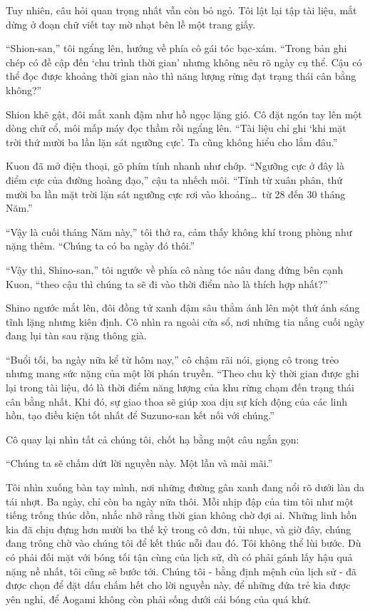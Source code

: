 \documentclass[../main.tex]{subfiles}
\begin{document}
Tuy nhiên, câu hỏi quan trọng nhất vẫn còn bỏ ngỏ. Tôi lật lại tập tài liệu, mắt dừng ở đoạn chữ viết tay mờ nhạt bên lề một trang giấy.

``Shion-san,'' tôi ngẩng lên, hướng về phía cô gái tóc bạc-xám. ``Trong bản ghi chép có đề cập đến `chu trình thời gian' nhưng không nêu rõ ngày cụ thể. Cậu có thể đọc được khoảng thời gian nào thì năng lượng rừng đạt trạng thái cân bằng không?''

Shion khẽ gật, đôi mắt xanh đậm như hồ ngọc lặng gió. Cô đặt ngón tay lên một dòng chữ cổ, môi mấp máy đọc thầm rồi ngẩng lên. ``Tài liệu chỉ ghi `khi mặt trời thứ mười ba lần lặn sát ngưỡng cực'. Ta cũng không hiểu cho lắm đâu.''

Kuon đã mở điện thoại, gõ phím tính nhanh như chớp. ``Ngưỡng cực ở đây là điểm cực của đường hoàng đạo,'' cậu ta nhếch môi. ``Tính từ xuân phân, thứ mười ba lần mặt trời lặn sát ngưỡng cực rơi vào khoảng\dots\ từ 28 đến 30 tháng Năm.''

``Vậy là cuối tháng Năm này,'' tôi thở ra, cảm thấy không khí trong phòng như nặng thêm. ``Chúng ta có ba ngày đó thôi.''

``Vậy thì, Shino-san,'' tôi ngước về phía cô nàng tóc nâu đang đứng bên cạnh Kuon, ``theo cậu thì chúng ta sẽ đi vào thời điểm nào là thích hợp nhất?''

Shino ngước mắt lên, đôi đồng tử xanh đậm sâu thẳm ánh lên một thứ ánh sáng tĩnh lặng nhưng kiên định. Cô nhìn ra ngoài cửa sổ, nơi những tia nắng cuối ngày đang lụi tàn sau rặng thông già.

``Buổi tối, ba ngày nữa kể từ hôm nay,'' cô chậm rãi nói, giọng cô trong trẻo nhưng mang sức nặng của một lời phán truyền. ``Theo chu kỳ thời gian được ghi lại trong tài liệu, đó là thời điểm năng lượng của khu rừng chạm đến trạng thái cân bằng nhất. Khi đó, sự giao thoa sẽ giúp xoa dịu sự kích động của các linh hồn, tạo điều kiện tốt nhất để Suzuno-san kết nối với chúng.''

Cô quay lại nhìn tất cả chúng tôi, chốt hạ bằng một câu ngắn gọn:

``Chúng ta sẽ chấm dứt lời nguyền này. Một lần và mãi mãi.''

Tôi nhìn xuống bàn tay mình, nơi những đường gân xanh đang nổi rõ dưới làn da tái nhợt. Ba ngày, chỉ còn ba ngày nữa thôi. Mỗi nhịp đập của tim tôi như một tiếng trống thúc dồn, nhắc nhở rằng thời gian không chờ đợi ai. Những linh hồn kia đã chịu đựng hơn mười ba thế kỷ trong cô đơn, tủi nhục, và giờ đây, chúng đang trông chờ vào chúng tôi để kết thúc nỗi đau đó. Tôi không thể lùi bước. Dù có phải đối mặt với bóng tối tận cùng của lịch sử, dù có phải gánh lấy hậu quả nặng nề nhất, tôi cũng sẽ bước tới. Chúng tôi - bằng định mệnh của lịch sử - đã được chọn để đặt dấu chấm hết cho lời nguyền này, để những đứa trẻ kia được yên nghỉ, để Aogami không còn phải sống dưới cái bóng của quá khứ.
\end{document}
